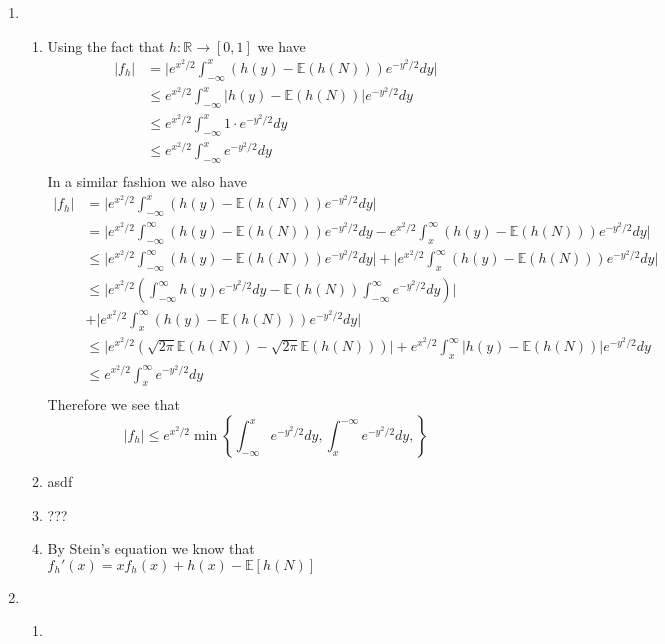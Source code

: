 \documentclass[12pt]{article}  %
\newcommand{\R}{{\mathbb{R}}}
\newcommand{\E}{{\mathbb{E}}}
\begin{document}
\begin{enumerate}
\item 
\begin{enumerate}
\item Using the fact that $h:\R\to[0,1]$ we have 
\begin{align*}
|f_h| &= \Big|e^{x^2/2}\int_{-\infty}^x \left(h(y)-\E(h(N))\right)e^{-y^2/2}dy\Big|\\
&\leq e^{x^2/2}\int_{-\infty}^x \Big|h(y)-\E(h(N))\Big|e^{-y^2/2}dy\\
&\leq e^{x^2/2}\int_{-\infty}^x 1\cdot e^{-y^2/2}dy\\
&\leq e^{x^2/2}\int_{-\infty}^x e^{-y^2/2}dy\\
\end{align*}
In a similar fashion we also have
\begin{align*}
|f_h| &= \Big|e^{x^2/2}\int_{-\infty}^x \left(h(y)-\E(h(N))\right)e^{-y^2/2}dy\Big|\\
&= \Big|e^{x^2/2}\int_{-\infty}^{\infty} \left(h(y)-\E(h(N))\right)e^{-y^2/2}dy - e^{x^2/2}\int_{x}^{\infty} \left(h(y)-\E(h(N))\right)e^{-y^2/2}dy\Big|\\
&\leq \Big|e^{x^2/2}\int_{-\infty}^{\infty} \left(h(y)-\E(h(N))\right)e^{-y^2/2}dy\Big| + \Big|e^{x^2/2}\int_{x}^{\infty} \left(h(y)-\E(h(N))\right)e^{-y^2/2}dy\Big|\\
&\leq \Big|e^{x^2/2}\left(\int_{-\infty}^{\infty}h(y)e^{-y^2/2}dy-\E(h(N))\int_{-\infty}^{\infty}e^{-y^2/2}dy\right)\Big| \\&+ \Big|e^{x^2/2}\int_{x}^{\infty} \left(h(y)-\E(h(N))\right)e^{-y^2/2}dy\Big|\\
&\leq \Big|e^{x^2/2}\left(\sqrt{2\pi}\E(h(N))-\sqrt{2\pi}\E(h(N))\right)\Big| + e^{x^2/2}\int_{x}^{\infty} \Big|h(y)-\E(h(N))\Big|e^{-y^2/2}dy\\
&\leq e^{x^2/2}\int_{x}^{\infty} e^{-y^2/2}dy\\
\end{align*}
Therefore we see that $$|f_h|\leq e^{x^2/2}\min\left\{\int_{-\infty}^xe^{-y^2/2}dy,\int_x^{-\infty}e^{-y^2/2}dy,\right\}$$
\item asdf
\item ???
\item By Stein's equation we know that $f_h'(x) = xf_h(x) + h(x)-\E[h(N)]$
\end{enumerate}	
\item 
\begin{enumerate}
\item 
\begin{align*}

\end{align*}
\end{enumerate}
\end{enumerate}
\end{document}
